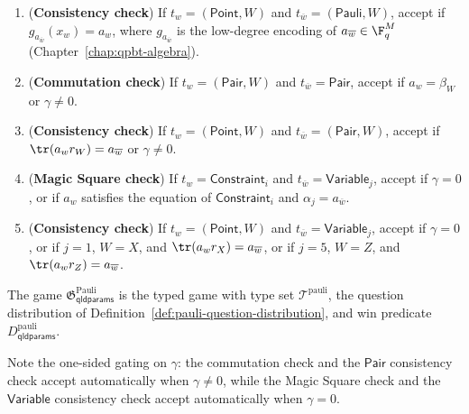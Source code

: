 \begin{definition}
\begin{enumerate}
\begin{enumerate}
		\end{enumerate}
		\item (\textbf{Consistency check}) If $t_w = (\mathsf{Point},W)$ and $t_{\overline w} = (\mathsf{Pauli},W)$, accept if $g_{a_{\overline w}}(x_w) = a_w$, where $g_{a_{\overline w}}$ is the low-degree encoding of $a_{\overline w} \in \F_q^M$ (Chapter~\ref{chap:qpbt-algebra}).
		\item (\textbf{Commutation check}) If $t_w = (\mathsf{Pair},W)$ and $t_{\overline w} = \mathsf{Pair}$, accept if $a_w = \beta_W$ or $\gamma \neq 0$.
		\item (\textbf{Consistency check}) If $t_w = (\mathsf{Point},W)$ and $t_{\overline w} = (\mathsf{Pair},W)$, accept if $\tr(a_w r_W) = a_{\overline w}$ or $\gamma \neq 0$.
		\item (\textbf{Magic Square check}) If $t_w = \mathsf{Constraint}_i$ and $t_{\overline w} = \mathsf{Variable}_j$, accept if $\gamma = 0$, or if $a_w$ satisfies the equation of $\mathsf{Constraint}_i$ and $\alpha_j = a_{\overline w}$.
		\item (\textbf{Consistency check}) If $t_w = (\mathsf{Point},W)$ and $t_{\overline w} = \mathsf{Variable}_j$, accept if $\gamma = 0$, or if $j = 1$, $W = X$, and $\tr(a_w r_X) = a_{\overline w}$, or if $j = 5$, $W = Z$, and $\tr(a_w r_Z) = a_{\overline w}$.
	\end{enumerate}
	The game $\mathfrak{G}^{\mathrm{Pauli}}_{\mathsf{qldparams}}$ is the typed game with type set $\mathcal T^{\mathrm{pauli}}$, the question distribution of Definition~\ref{def:pauli-question-distribution}, and win predicate $D^{\mathrm{pauli}}_{\mathsf{qldparams}}$.
\end{definition}

Note the one-sided gating on $\gamma$: the commutation check and the $\mathsf{Pair}$ consistency check accept automatically when $\gamma \neq 0$, while the Magic Square check and the $\mathsf{Variable}$ consistency check accept automatically when $\gamma = 0$.

